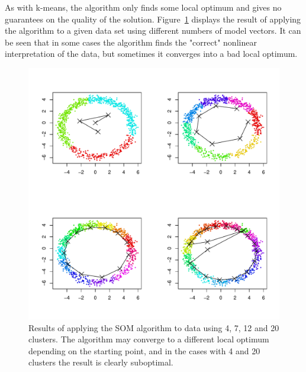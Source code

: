 \documentclass{article}
\begin{document}
As with k-means, the algorithm only finds some local optimum and gives no guarantees on the quality of the solution.
Figure~\ref{fig:som} displays the result of applying the algorithm to a given data set using different numbers of model vectors.
It can be seen that in some cases the algorithm finds the "correct" nonlinear interpretation of the data, but sometimes it converges into a bad local optimum.

\begin{figure}\centering
	\includegraphics[width=\columnwidth]{som}
	\caption{Results of applying the SOM algorithm to data using 4, 7, 12 and 20 clusters. The algorithm may converge to a different local optimum depending on the starting point, and in the cases with 4 and 20 clusters the result is clearly suboptimal.}\label{fig:som}
\end{figure}
\end{document}
